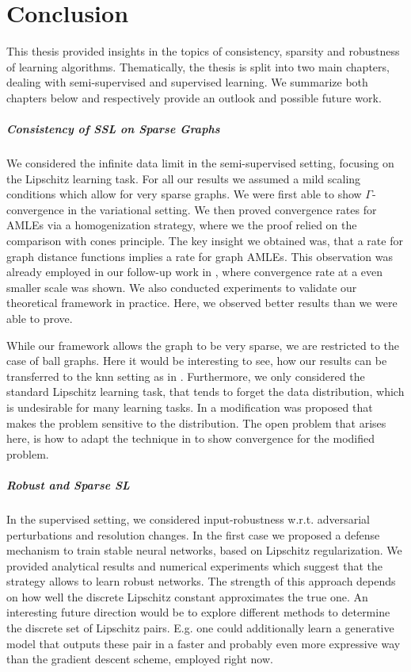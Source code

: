 \chapter{Conclusion}\label{ch:C}
%
%
This thesis provided insights in the topics of consistency, sparsity and robustness of learning algorithms. Thematically, the thesis is split into two main chapters, dealing with semi-supervised and supervised learning. We summarize both chapters below and respectively provide an outlook and possible future work.

\paragraph{Consistency of SSL on Sparse Graphs} We considered the infinite data limit in the semi-supervised setting, focusing on the Lipschitz learning task. For all our results we assumed a mild scaling conditions which allow for very sparse graphs. We were first able to show $\Gamma$-convergence in the variational setting. We then proved convergence rates for AMLEs via a homogenization strategy, where we the proof relied on the comparison with cones principle. The key insight we obtained was, that a rate for graph distance functions implies a rate for graph AMLEs. This observation was already employed in our follow-up work in \cite{bungert2022ratio}, where convergence rate at a even smaller scale was shown. We also conducted experiments to validate our theoretical framework in practice. Here, we observed better results than we were able to prove. 

While our framework allows the graph to be very sparse, we are restricted to the case of ball graphs. Here it would be interesting to see, how our results can be transferred to the knn setting as in \cite{calder2022improved}. Furthermore, we only considered the standard Lipschitz learning task, that tends to forget the data distribution, which is undesirable for many learning tasks. In \cite{calder2019consistency} a modification was proposed that makes the problem sensitive to the distribution. The open problem that arises here, is how to adapt the technique in \cite{bungert2021uniform} to show convergence for the modified problem.\par

\paragraph{Robust and Sparse SL} In the supervised setting, we considered input-robustness w.r.t. adversarial perturbations and resolution changes. In the first case we proposed a defense mechanism to train stable neural networks, based on Lipschitz regularization. We provided analytical results and numerical experiments which suggest that the strategy allows to learn robust networks. The strength of this approach depends on how well the discrete Lipschitz constant approximates the true one. An interesting future direction would be to explore different methods to determine the discrete set of Lipschitz pairs. E.g. one could additionally learn a generative model that outputs these pair in a faster and probably even more expressive way than the gradient descent scheme, employed right now.

